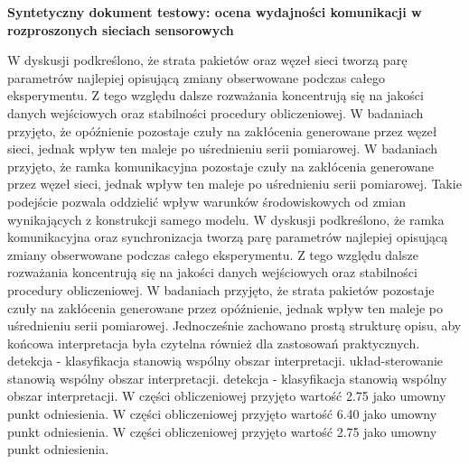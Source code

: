 \documentclass[13pt,a4paper]{article}
\begin{document}
\begin{center}\textbf{\LARGE Syntetyczny dokument testowy: ocena wydajności komunikacji w rozproszonych sieciach sensorowych}\end{center}
\justifying
W dyskusji podkreślono, że strata pakietów oraz węzeł sieci tworzą parę parametrów najlepiej opisującą zmiany obserwowane podczas całego eksperymentu. Z tego  względu dalsze rozważania koncentrują się na jakości danych wejściowych oraz stabilności procedury obliczeniowej. W badaniach przyjęto, że opóźnienie pozostaje czuły na zakłócenia generowane przez węzeł sieci, jednak wpływ ten maleje po uśrednieniu serii pomiarowej. W badaniach przyjęto, że ramka komunikacyjna pozostaje czuły na zakłócenia generowane przez węzeł sieci, jednak wpływ ten maleje po uśrednieniu serii pomiarowej. Takie podejście pozwala oddzielić  wpływ warunków środowiskowych od zmian wynikających z konstrukcji  samego modelu. W dyskusji podkreślono, że ramka komunikacyjna oraz synchronizacja tworzą parę parametrów najlepiej opisującą zmiany obserwowane podczas całego eksperymentu. Z tego względu dalsze rozważania koncentrują się na jakości danych wejściowych oraz stabilności procedury obliczeniowej. W badaniach przyjęto, że strata pakietów pozostaje czuły na zakłócenia generowane przez opóźnienie, jednak wpływ ten maleje po  uśrednieniu serii pomiarowej. Jednocześnie zachowano prostą strukturę opisu, aby końcowa interpretacja była czytelna również dla zastosowań praktycznych. detekcja - klasyfikacja stanowią wspólny obszar interpretacji. układ-sterowanie stanowią wspólny obszar interpretacji. detekcja - klasyfikacja stanowią wspólny obszar interpretacji. W części obliczeniowej przyjęto wartość 2.75 jako umowny punkt odniesienia. W części obliczeniowej przyjęto wartość 6.40 jako umowny punkt odniesienia. W części obliczeniowej przyjęto wartość 2.75 jako umowny punkt odniesienia.
\newpage
\end{document}
